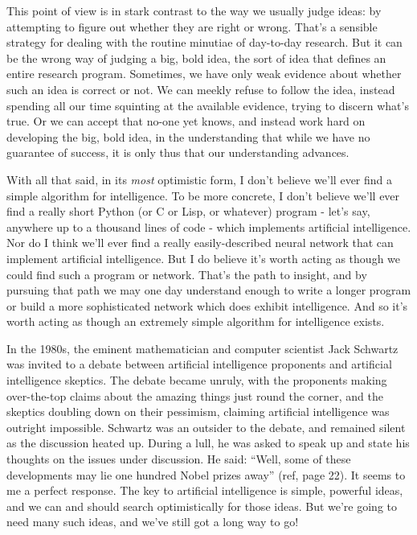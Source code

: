 This point of view is in stark contrast to the way we usually judge ideas: by attempting to figure out whether they are right or wrong. That's a sensible strategy for dealing with the routine minutiae of day-to-day research. But it can be the wrong way of judging a big, bold idea, the sort of idea that defines an entire research program. Sometimes, we have only weak evidence about whether such an idea is correct or not. We can meekly refuse to follow the idea, instead spending all our time squinting at the available evidence, trying to discern what's true. Or we can accept that no-one yet knows, and instead work hard on developing the big, bold idea, in the understanding that while we have no guarantee of success, it is only thus that our understanding advances.


With all that said, in its \emph{most} optimistic form, I don't believe we'll ever find a simple algorithm for intelligence. To be more concrete, I don't believe we'll ever find a really short Python (or C or Lisp, or whatever) program - let's say, anywhere up to a thousand lines of code - which implements artificial intelligence. Nor do I think we'll ever find a really easily-described neural network that can implement artificial intelligence. But I do believe it's worth acting as though we could find such a program or network. That's the path to insight, and by pursuing that path we may one day understand enough to write a longer program or build a more sophisticated network which does exhibit intelligence. And so it's worth acting as though an extremely simple algorithm for intelligence exists.


In the 1980s, the eminent mathematician and computer scientist Jack Schwartz was invited to a debate between artificial intelligence proponents and artificial intelligence skeptics. The debate became unruly, with the proponents making over-the-top claims about the amazing things just round the corner, and the skeptics doubling down on their pessimism, claiming artificial intelligence was outright impossible. Schwartz was an outsider to the debate, and remained silent as the discussion heated up. During a lull, he was asked to speak up and state his thoughts on the issues under discussion. He said: ``Well, some of these developments may lie one hundred Nobel prizes away'' (ref, page 22). It seems to me a perfect response. The key to artificial intelligence is simple, powerful ideas, and we can and should search optimistically for those ideas. But we're going to need many such ideas, and we've still got a long way to go!
